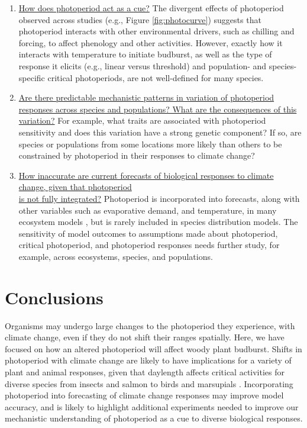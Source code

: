 \documentclass{article}
\begin{document}
\begin{enumerate}
\item \underline{How does photoperiod act as a cue?} The divergent effects of photoperiod observed across studies (e.g., Figure \ref{fig:photocurve}) suggests that photoperiod interacts with other environmental drivers, such as chilling and forcing, to affect phenology and other activities. However, exactly how it interacts with temperature to initiate budburst, as well as the type of response it elicits (e.g., linear versus threshold) and population- and species-specific critical photoperiods, are not well-defined for many species.  
\item \underline{Are there predictable mechanistic patterns in variation of photoperiod responses across species and populations? What are the consequences of this variation?} For example, what traits are associated with photoperiod sensitivity and does this variation have a strong genetic component? If so, are species or populations from some locations more likely than others to be constrained by photoperiod in their responses to climate change?

\item \underline{How inaccurate are current forecasts of biological responses to climate change, given that photoperiod \\ 
is not fully integrated?} Photoperiod is incorporated into forecasts, along with other variables such as evaporative demand, and temperature, in many ecosystem models \citep [e.g. ED] []{jolly2005, medvigy2013}, but is rarely included in species distribution models. The sensitivity of model outcomes to assumptions made about photoperiod, critical photoperiod, and photoperiod responses needs further study, for example, across ecosystems, species, and populations.

\end{enumerate}

\section*{Conclusions}
Organisms may undergo large changes to the photoperiod they experience, with climate change, even if they do not shift their ranges spatially.  Here, we have focused on how an altered photoperiod will affect woody plant budburst. Shifts in photoperiod with climate change are likely to have implications for a variety of plant and animal responses, given that daylength affects critical activities for diverse species from insects \citep{bradshaw2006,linn1996} and salmon \citep{solbakken1994,taranger2003} to birds \citep{dawson2001} and marsupials \citep{mcallan2006,solbakken1994}. Incorporating photoperiod into forecasting of climate change responses may improve model accuracy, and is likely to highlight additional experiments needed to improve our mechanistic understanding of photoperiod as a cue to diverse biological responses. 
\end{document}
